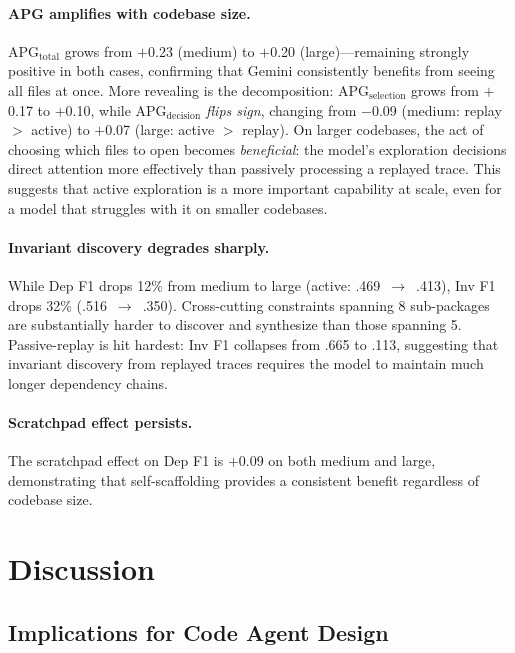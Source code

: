 \documentclass{article}
\begin{document}
\paragraph{APG amplifies with codebase size.}
$\text{APG}_\text{total}$ grows from $+$0.23 (medium) to $+$0.20 (large)---remaining strongly positive in both cases, confirming that Gemini consistently benefits from seeing all files at once. More revealing is the decomposition: $\text{APG}_\text{selection}$ grows from $+$0.17 to $+$0.10, while $\text{APG}_\text{decision}$ \emph{flips sign}, changing from $-$0.09 (medium: replay $>$ active) to $+$0.07 (large: active $>$ replay). On larger codebases, the act of choosing which files to open becomes \emph{beneficial}: the model's exploration decisions direct attention more effectively than passively processing a replayed trace. This suggests that active exploration is a more important capability at scale, even for a model that struggles with it on smaller codebases.

\paragraph{Invariant discovery degrades sharply.}
While Dep F1 drops 12\% from medium to large (active: .469~$\to$~.413), Inv F1 drops 32\% (.516~$\to$~.350). Cross-cutting constraints spanning 8 sub-packages are substantially harder to discover and synthesize than those spanning 5. Passive-replay is hit hardest: Inv F1 collapses from .665 to .113, suggesting that invariant discovery from replayed traces requires the model to maintain much longer dependency chains.

\paragraph{Scratchpad effect persists.}
The scratchpad effect on Dep F1 is $+$0.09 on both medium and large, demonstrating that self-scaffolding provides a consistent benefit regardless of codebase size.

\section{Discussion}
\label{sec:discussion}

\subsection{Implications for Code Agent Design}
\end{document}
